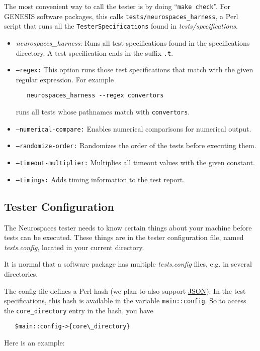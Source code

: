 \documentclass[12pt]{article}
\begin{document}
The most convenient way to call the tester is by doing ``{\tt make check}''. For GENESIS software packages, this calls {\tt tests/neurospaces\_harness}, a Perl script that runs all the {\tt TesterSpecifications} found in {\it tests/specifications}.

\begin{itemize}
\item {\it neurospaces\_harness}: Runs all test specifications found in the specifications directory. A test specification ends in the suffix {\tt .t}.
\item {\tt --regex:} This option runs those test specifications that match with the given regular expression. For example
\begin{verbatim}
   neurospaces_harness --regex convertors
\end{verbatim}
runs all tests whose pathnames match with {\tt convertors}.
\item {\tt --numerical-compare:} Enables numerical comparisons for numerical output.
\item {\tt --randomize-order:} Randomizes the order of the tests before executing them.
\item {\tt --timeout-multiplier:} Multiplies all timeout values with the given constant.
\item {\tt --timings:} Adds timing information to the test report.
\end{itemize}
    
\subsection*{Tester Configuration}

The Neurospaces tester needs to know certain things about your machine before tests can be executed. These things are in the tester configuration file, named {\it tests.config}, located in your current directory.

It is normal that a software package has multiple {\it tests.config} files, e.g. in several directories.

The config file defines a Perl hash (we plan to also support \href{http://www.json.org/}{JSON}). In the test specifications, this hash is available in the variable {\tt main::config}. So to access the {\tt core\_directory} entry in the hash, you have
\begin{verbatim}
   $main::config->{core\_directory}
\end{verbatim}
Here is an example:
\end{document}
